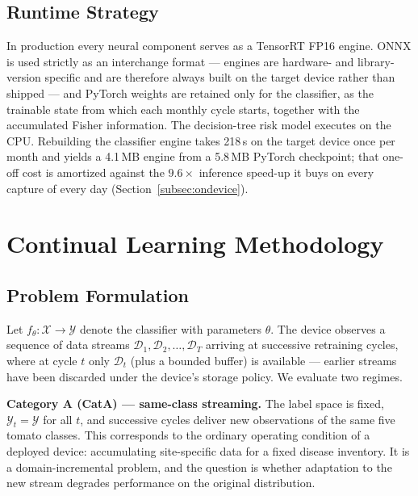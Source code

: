 \documentclass[journal]{IEEEtran}
\begin{document}
\subsection{Runtime Strategy}

In production every neural component serves as a TensorRT FP16 engine. ONNX is used
strictly as an interchange format --- engines are hardware- and library-version
specific and are therefore always built on the target device rather than shipped ---
and PyTorch weights are retained only for the classifier, as the trainable state from
which each monthly cycle starts, together with the accumulated Fisher information.
The decision-tree risk model executes on the CPU. Rebuilding the classifier engine
takes 218\,s on the target device once per month and yields a 4.1\,MB engine from a
5.8\,MB PyTorch checkpoint; that one-off cost is amortized against the
$9.6\times$ inference speed-up it buys on every capture of every day
(Section~\ref{subsec:ondevice}).

\section{Continual Learning Methodology}
\label{sec:cl}

\subsection{Problem Formulation}

Let $f_\theta: \mathcal{X} \rightarrow \mathcal{Y}$ denote the classifier with
parameters $\theta$. The device observes a sequence of data streams
$\mathcal{D}_1, \mathcal{D}_2, \ldots, \mathcal{D}_T$ arriving at successive
retraining cycles, where at cycle $t$ only $\mathcal{D}_t$ (plus a bounded buffer)
is available --- earlier streams have been discarded under the device's storage
policy. We evaluate two regimes.

\textbf{Category A (CatA) --- same-class streaming.} The label space is fixed,
$\mathcal{Y}_t = \mathcal{Y}$ for all $t$, and successive cycles deliver new
observations of the same five tomato classes. This corresponds to the ordinary
operating condition of a deployed device: accumulating site-specific data for a fixed
disease inventory. It is a domain-incremental problem, and the question is whether
adaptation to the new stream degrades performance on the original distribution.
\end{document}
